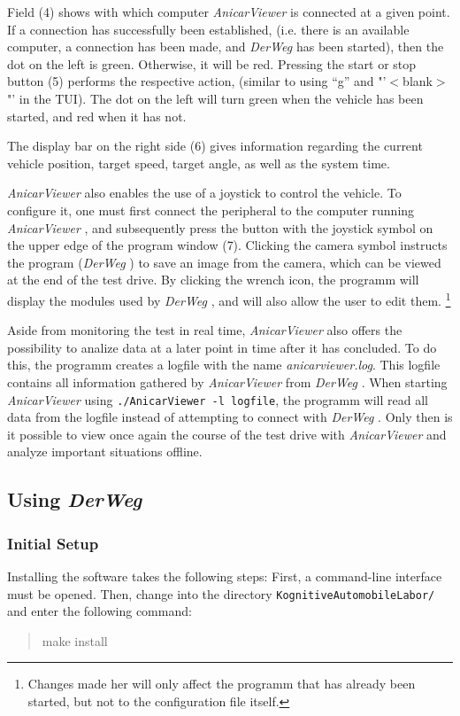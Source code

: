 \documentclass[a4paper, 11pt]{article}
\newcommand{\DerWeg}{\textit{DerWeg }} %
\newcommand{\AnicarViewer}{\textit{AnicarViewer }} %
\begin{document}
Field (4) shows with which computer \AnicarViewer is connected at a given point. If a connection has successfully been established, (i.e. there is an available computer, a connection has been made, and \DerWeg has been started), then the dot on the left is green. Otherwise, it will be red. Pressing the start or stop button (5) performs the respective action, (similar to using  "`g"' and "'\!$<$\!blank\!$>$\!"' in the TUI). The dot on the left will turn green when the vehicle has been started, and red when it has not.

The display bar on the right side (6) gives information regarding the current vehicle position, target speed, target angle, as well as the system time. 

\AnicarViewer also enables the use of a joystick to control the vehicle. To configure it, one must first connect the peripheral to the computer running \AnicarViewer, and subsequently press the button with the joystick symbol on the upper edge of the program window (7). Clicking the camera symbol instructs the program (\DerWeg) to save an image from the camera, which can be viewed at the end of the test drive. By clicking the wrench icon, the programm will display the modules used by \DerWeg, and will also allow the user to edit them. \footnote{Changes made her will only affect the programm that has already been started, but not to the configuration file itself.}

Aside from monitoring the test in real time, \AnicarViewer also offers the possibility to analize data at a later point in time after it has concluded. To do this, the programm creates a logfile with the name \textit{anicarviewer.log}. This logfile contains all information gathered by \AnicarViewer from \DerWeg. When starting \AnicarViewer using \texttt{./AnicarViewer -l logfile}, the programm will read all data from the logfile instead of attempting to connect with \DerWeg. Only then is it possible to view once again the course of the test drive with \AnicarViewer and analyze important situations offline. 

\subsection{Using \DerWeg}

\subsubsection{Initial Setup}

Installing the software takes the following steps: First, a command-line interface must be opened. Then, change into the directory \texttt{KognitiveAutomobileLabor/} and enter the following command:
\begin{quote}
make install
\end{quote}
\end{document}
